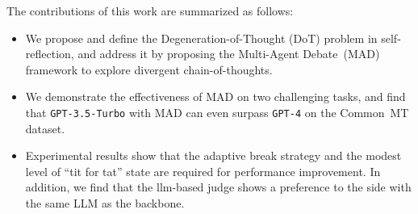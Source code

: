 The contributions of this work are summarized as follows:
\begin{itemize}[leftmargin=10pt]
    \item We propose and define the Degeneration-of-Thought (DoT) problem in self-reflection, and address it by proposing the Multi-Agent Debate~(MAD) framework to explore divergent chain-of-thoughts.
    
    \item We demonstrate the effectiveness of MAD on two challenging tasks, and find that \texttt{GPT-3.5-Turbo} with MAD can even surpass \texttt{GPT-4} on the Common~MT dataset.

    \item Experimental results show that the adaptive break strategy and the modest level of ``tit for tat'' state are required for performance improvement. In addition, we find that the llm-based judge shows a preference to the side with the same LLM as the backbone.
\end{itemize}
